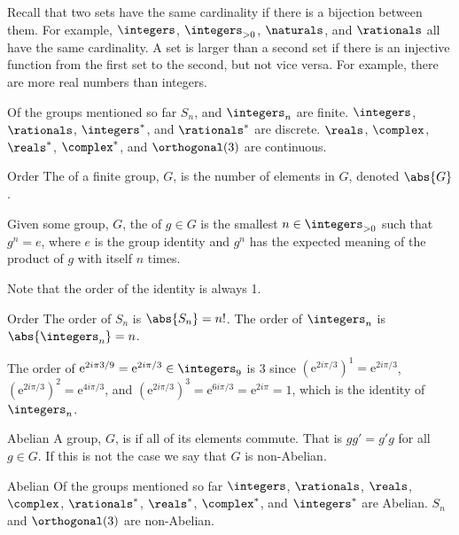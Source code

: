 \documentclass[fleqn]{NotesClass}
\newcommand*{\positiveintegers}{\integers_{>0}}
\newcommand*{\e}{\mathrm{e}}
\begin{document}
    Recall that two sets have the same cardinality if there is a bijection between them.
    For example, \(\integers\), \(\positiveintegers\), \(\naturals\), and \(\rationals\) all have the same cardinality.
    A set is larger than a second set if there is an injective function from the first set to the second, but not vice versa.
    For example, there are more real numbers than integers.
    
    \begin{exm}{}{}
        Of the groups mentioned so far \(S_n\), and \(\integers_n\) are finite.
        \(\integers\), \(\rationals\), \(\integers^*\), and \(\rationals^*\) are discrete.
        \(\reals\), \(\complex\), \(\reals^*\), \(\complex^*\), and \(\orthogonal(3)\) are continuous.
    \end{exm}
    
    \begin{dfn}{Order}{}
        The  of a finite group, \(G\), is the number of elements in \(G\), denoted \(\abs{G}\).
        
        Given some group, \(G\), the  of \(g \in G\) is the smallest \(n \in \positiveintegers\) such that \(g^n = e\), where \(e\) is the group identity and \(g^n\) has the expected meaning of the product of \(g\) with itself \(n\) times.
        
        Note that the order of the identity is always 1.
    \end{dfn}
    
    \begin{exm}{Order}{}
        The order of \(S_n\) is \(\abs{S_n} = n!\).
        The order of \(\integers_n\) is \(\abs{\integers_n} = n\).
        
        The order of \(\e^{2i\pi 3/9} = \e^{2i\pi/3} \in \integers_9\) is 3 since \((\e^{2i\pi/3})^1 = \e^{2i\pi/3}\), \((\e^{2i\pi/3})^2 = \e^{4i\pi/3}\), and \((\e^{2i\pi/3})^3 = \e^{6i\pi/3} = \e^{2i\pi} = 1\), which is the identity of \(\integers_n\).
    \end{exm}
    
    \begin{dfn}{Abelian}{}
        A group, \(G\), is  if all of its elements commute.
        That is \(gg' = g'g\) for all \(g \in G\).
        If this is not the case we say that \(G\) is non-Abelian.
    \end{dfn}
    
    \begin{exm}{Abelian}{}
        Of the groups mentioned so far \(\integers\), \(\rationals\), \(\reals\), \(\complex\), \(\rationals^*\), \(\reals^*\), \(\complex^*\), and \(\integers^*\) are Abelian.
        \(S_n\) and \(\orthogonal(3)\) are non-Abelian.
    \end{exm}
    
\end{document}
